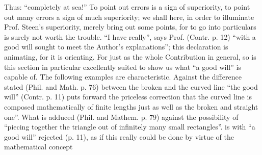 \documentclass[12pt,a4paper,openany]{book}
\begin{document}
Thus: ``completely at sea!'' To point out errors is
a sign of superiority, to point out many errors a sign
of much superiority; we shall here, in order to illuminate Prof.
Steen's superiority, merely bring out some points,
for to go into particulars is surely not worth the trouble.
``I have really'', says Prof. (Contr. p. 12) ``with a
good will sought to meet the Author's explanations''; this
declaration is animating, for it is orienting. For just as
the whole Contribution in general, so is this
section in particular excellently suited to show us what
``a good will'' is capable of. The following examples are characteristic. Against the difference stated (Phil. and Math. p. 76)
between the broken and the curved line ``the
good will'' (Contr. p. 11) puts forward the priceless correction that
the curved line is composed mathematically of finite
lengths just as well as the broken and straight one''. What is adduced (Phil.
and Mathem. p. 79) against the possibility of ``piecing together the triangle out of infinitely many small rectangles''.
is with ``a good will'' rejected (p. 11), as if this
really could be done by virtue of the mathematical concept
\end{document}
